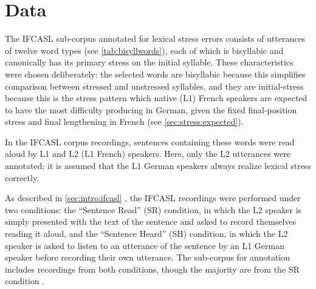  
	
	\section{Data}
	\label{sec:lexstress:data}
	
	The IFCASL sub-corpus annotated for lexical stress errors consists of utterances of twelve word types (see \cref{tab:bisyllwords}), each of which is bisyllabic and canonically has its primary stress on the initial syllable. These characteristics were chosen deliberately: the selected words are bisyllabic because this simplifies comparison between stressed and unstressed syllables, and they are initial-stress because this is the stress pattern which native (L1) French speakers are expected to have the most difficulty producing in German, given the fixed final-position stress and final lengthening in French (see \cref{sec:stress:expected}). 
	
	In the IFCASL corpus recordings, sentences containing these words were read aloud by L1 and L2 (L1 French) speakers. Here, only the L2 utterances were annotated; it is assumed that the L1 German speakers always realize lexical stress correctly. 
	
	As described in \cref{sec:intro:ifcasl} , the IFCASL recordings were performed under two conditions: the ``Sentence Read'' (SR) condition, in which the L2 speaker is simply  presented with the text of the sentence and asked to record themselves reading it aloud, and the ``Sentence Heard'' (SH) condition, in which the L2 speaker is asked to listen to an utterance of the sentence by an L1 German speaker before recording their own utterance. The sub-corpus for annotation includes recordings from both conditions, though the majority are from the SR condition .
	
